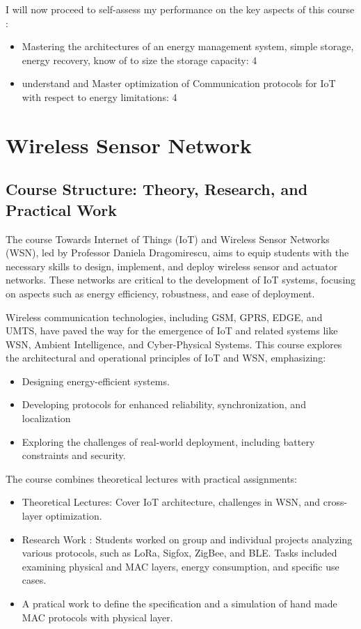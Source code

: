 I will now proceed to self-assess my performance on the key aspects of this course :

\begin{itemize}
    \item Mastering the architectures of an energy management system, simple storage, energy recovery, know of to size the storage capacity: 4
    \item understand and Master optimization of Communication protocols for IoT with respect to energy limitations: 4
\end{itemize}


\section{Wireless Sensor Network}

\subsection{Course Structure: Theory, Research, and Practical Work}

The course Towards Internet of Things (IoT) and Wireless Sensor Networks (WSN), led by Professor Daniela Dragomirescu, aims to equip students with the necessary skills to design, implement, and deploy wireless sensor and actuator networks. These networks are critical to the development of IoT systems, focusing on aspects such as energy efficiency, robustness, and ease of deployment.

Wireless communication technologies, including GSM, GPRS, EDGE, and UMTS, have paved the way for the emergence of IoT and related systems like WSN, Ambient Intelligence, and Cyber-Physical Systems. This course explores the architectural and operational principles of IoT and WSN, emphasizing:

\begin{itemize}
    \item Designing energy-efficient systems.
    \item Developing protocols for enhanced reliability, synchronization, and localization
    \item Exploring the challenges of real-world deployment, including battery constraints and security.
\end{itemize}

The course combines theoretical lectures with practical assignments:

\begin{itemize}
    \item Theoretical Lectures: Cover IoT architecture, challenges in WSN, and cross-layer optimization.
    \item Research Work : Students worked on group and individual projects analyzing various protocols, such as LoRa, Sigfox, ZigBee, and BLE. Tasks included examining physical and MAC layers, energy consumption, and specific use cases.
    \item A pratical work to define the specification and a simulation of hand made MAC protocols with physical layer.
\end{itemize}


